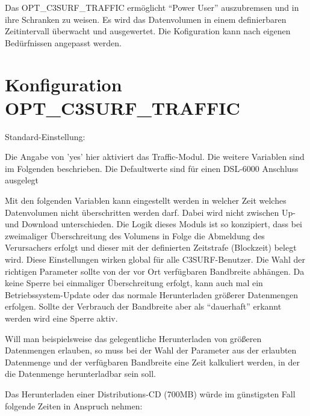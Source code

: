   Das OPT\_C3SURF\_TRAFFIC ermöglicht ``Power User'' auszubremsen und in ihre Schranken zu weisen.
  Es wird das Datenvolumen in einem definierbaren Zeitintervall überwacht und ausgewertet. Die 
  Kofiguration kann nach eigenen Bedürfnissen angepasst werden.

\section {Konfiguration OPT\_C3SURF\_TRAFFIC}

\begin{description}

   
  Standard-Einstellung: 
   
  Die Angabe von 'yes' hier aktiviert das Traffic-Modul. Die weitere Variablen sind im
  Folgenden beschrieben. Die Defaultwerte sind für einen DSL-6000 Anschluss ausgelegt
   
  Mit den folgenden Variablen kann eingestellt werden in welcher Zeit welches Datenvolumen nicht überschritten
  werden darf. Dabei wird nicht zwischen Up- und Download unterschieden. Die Logik dieses Moduls ist so konzipiert,
  dass bei zweimaliger Überschreitung des Volumens in Folge die Abmeldung des Verursachers erfolgt und dieser mit
  der definierten Zeitstrafe (Blockzeit) belegt wird. Diese Einstellungen wirken global für alle C3SURF-Benutzer.
  Die Wahl der richtigen Parameter sollte von der vor Ort verfügbaren Bandbreite abhängen. Da keine Sperre bei
  einmaliger Überschreitung erfolgt, kann auch mal ein Betriebssystem-Update oder das normale Herunterladen größerer
  Datenmengen erfolgen. Sollte der Verbrauch der Bandbreite aber als ``dauerhaft'' erkannt werden wird eine
  Sperre aktiv.
   
  Will man beispielsweise das gelegentliche Herunterladen von größeren Datenmengen erlauben, so muss bei
  der Wahl der Parameter aus der erlaubten Datenmenge und der verfügbaren Bandbreite eine Zeit kalkuliert
  werden, in der die Datenmenge herunterladbar sein soll.


   Das Herunterladen einer Distributions-CD (700MB) würde im günstigsten
   Fall folgende Zeiten in Anspruch nehmen:
   
   \begin{tabular}{lrlrl}
    

\end{tabular}
\end{description}
